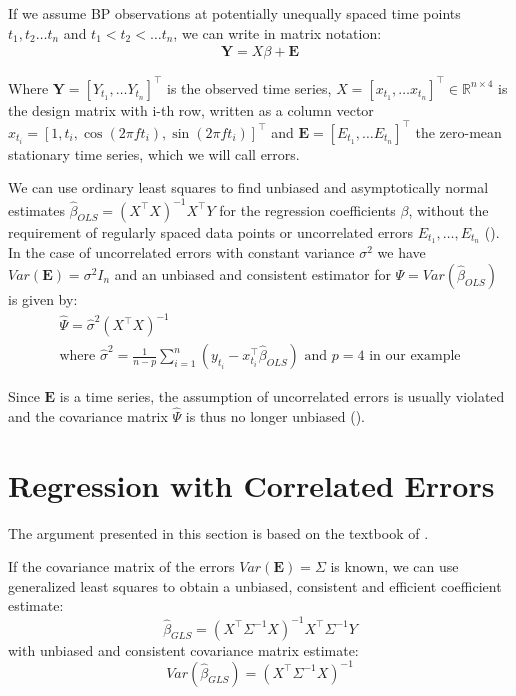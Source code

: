 If we assume BP observations at potentially unequally spaced
time points $t_1, t_2 \dots t_n$ and $t_1 < t_2 < \dots t_n$, we can write in matrix notation:
\begin{gather*}
\mathbf{Y} = X \beta + \mathbf{E}
\end{gather*}

Where $\mathbf{Y} = [Y_{t_1}, \dots Y_{t_n}]^{\top}$ is the observed time series,
$X = [x_{t_1}, \dots x_{t_n}]^{\top} \in \mathbb{R}^{n \times 4}$ is the design matrix with i-th row, written as a column vector
$x_{t_i} = [1, t_i, \cos(2 \pi f t_i), \sin(2 \pi f t_i)]^{\top}$
and $\mathbf{E} = [E_{t_1}, \dots E_{t_n}]^{\top}$ the zero-mean stationary time series,
which we will call errors.

We can use ordinary least squares to find unbiased and asymptotically normal estimates $\hat{\beta}_{OLS} = (X^{\top}X)^{-1} X^{\top}Y$
for the regression coefficients $\beta$, without the requirement of regularly spaced data points or uncorrelated errors
$E_{t_1}, \dots, E_{t_n}$ (\citeauthor{white_asymptotic_2001}).
In the case of uncorrelated errors with constant variance $\sigma^2$ we have
$Var(\mathbf{E}) = \sigma^2 I_n$ and an unbiased and consistent estimator for $\Psi = Var(\hat{\beta}_{OLS})$ is given by:
\begin{gather*}
\hat{\Psi} = \hat{\sigma}^2(X^{\top}X)^{-1} \\
    \text{where $\hat{\sigma}^2=\frac{1}{n-p} \sum_{i = 1}^{n} (y_{t_i} - x_{t_i}^{\top} \hat{\beta}_{OLS})$ and $p=4$ in our example}
\end{gather*}

Since $\mathbf{E}$ is a time series, the assumption of uncorrelated errors is usually violated and the
covariance matrix $\hat{\Psi}$ is thus no longer unbiased (\citeauthor{brockwell_introduction_2016}).

\section{Regression with Correlated Errors}

The argument presented in this section is based on the textbook of \citeauthor{brockwell_introduction_2016}.

If the covariance matrix of the errors $Var(\mathbf{E}) = \Sigma$ is known,
we can use generalized least squares to obtain a unbiased, consistent and efficient coefficient estimate:
\[\hat{\beta}_{GLS} = (X^{\top} \Sigma^{-1} X)^{-1} X^{\top} \Sigma^{-1} Y\]
with unbiased and consistent covariance matrix estimate:
\[Var(\hat{\beta}_{GLS}) = (X^{\top} \Sigma^{-1} X)^{-1}\]

